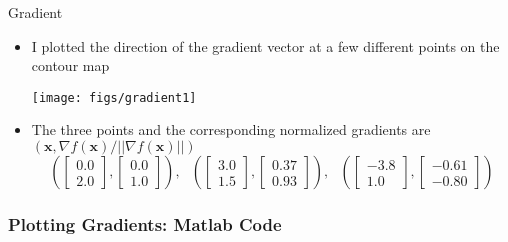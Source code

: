 \documentclass[xcolor=dvipsnames,11pt]{beamer}
\begin{document}
\begin{frame}{Gradient}
	\begin{itemize}
		\item I plotted the direction of the gradient vector at a few different points on the contour map
		\begin{center}
			\texttt{[image: figs/gradient1]}
		\end{center}
		\item The three points and the corresponding normalized gradients are $(\mathbf{x}, \nabla f(\mathbf{x})/||\nabla f(\mathbf{x})  ||)$
		$$\left( \begin{bmatrix} 0.0 \\ 2.0 \end{bmatrix}, \begin{bmatrix} 0.0 \\ 1.0 \end{bmatrix} \right),~~~\left(\begin{bmatrix} 3.0 \\ 1.5 \end{bmatrix}, \begin{bmatrix} 0.37  \\  0.93 \end{bmatrix} \right), ~~~ \left( \begin{bmatrix} -3.8 \\ 1.0 \end{bmatrix}, \begin{bmatrix}     -0.61 \\  -0.80 \end{bmatrix} \right) $$
	\end{itemize}
\end{frame}

\begin{frame}
	\frametitle{Plotting Gradients: Matlab Code}
	
	\vspace{-3pt}	
	
	
\end{frame}
\end{document}
